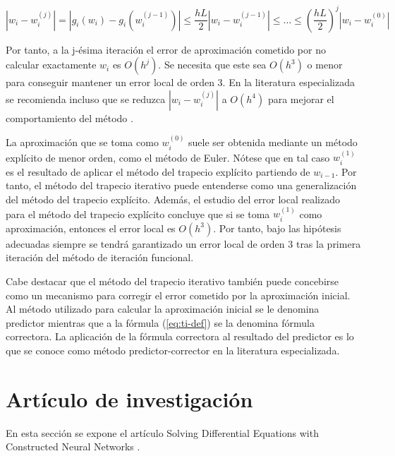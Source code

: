 \documentclass{article}
\theoremstyle{theorem-style}  %
\theoremstyle{definition-style}
\theoremstyle{example-style}
\begin{document}
	$$ \left|w_i - w_i^{(j)}\right| = \left|g_i(w_i) - g_i(w_i^{(j-1)})\right| \le \frac{hL}{2} \left|w_i - w_i^{(j-1)}\right| \le \ldots \le \left(\frac{hL}{2}\right)^j \left|w_i - w_i^{(0)}\right| $$

	Por tanto, a la j-ésima iteración el error de aproximación cometido por no calcular exactamente $w_i$ es $O(h^j)$. Se necesita que este sea $O(h^3)$ o menor para conseguir mantener un error local de orden $3$. En la literatura especializada se recomienda incluso que se reduzca $\left|w_i - w_i^{(j)}\right|$ a $O(h^4)$ para mejorar el comportamiento del método \cite{akitson}.

	La aproximación que se toma como $w_i^{(0)}$ suele ser obtenida mediante un método explícito de menor orden, como el método de Euler. Nótese que en tal caso $w_i^{(1)}$ es el resultado de aplicar el método del trapecio explícito partiendo de $w_{i-1}$. Por tanto, el método del trapecio iterativo puede entenderse como una generalización del método del trapecio explícito. Además, el estudio del error local realizado para el método del trapecio explícito concluye que si se toma $w_i^{(1)}$ como aproximación, entonces el error local es $O(h^3)$. Por tanto, bajo las hipótesis adecuadas siempre se tendrá garantizado un error local de orden 3 tras la primera iteración del método de iteración funcional.

	Cabe destacar que el método del trapecio iterativo también puede concebirse como un mecanismo para corregir el error cometido por la aproximación inicial. Al método utilizado para calcular la aproximación inicial se le denomina predictor mientras que a la fórmula (\ref{eq:ti-def}) se la denomina fórmula correctora. La aplicación de la fórmula correctora al resultado del predictor es lo que se conoce como método predictor-corrector en la literatura especializada.


\section{Artículo de investigación} \label{sec:paper}

En esta sección se expone el artículo Solving Differential Equations with Constructed Neural Networks \cite{articulo}.
\end{document}
